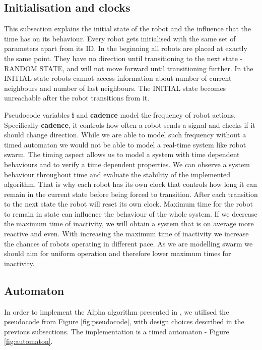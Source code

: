\subsection{Initialisation and clocks}
This subsection explains the initial state of the robot and the influence that the time has on its behaviour. Every robot gets initialised with the same set of parameters apart from its ID. In the beginning all robots are placed at exactly the same point. They have no direction until transitioning to the next state - RANDOM STATE, and will not move forward until transitioning further. In the INITIAL state robots cannot access information about number of current neighbours and number of last neighbours. The INITIAL state becomes unreachable after the robot transitions from it.

Pseudocode variables \textbf{i} and \textbf{cadence} model the frequency of robot actions. Specifically \textbf{cadence}, it controls how often a robot sends a signal and checks if it should change direction. While we are able to model such frequency without a timed automaton we would not be able to model a real-time system like robot swarm. The timing aspect allows us to model a system with time dependent behaviours and to verify a time dependent properties. We can observe a system behaviour throughout time and evaluate the stability of the implemented algorithm. That is why each robot has its own clock that controls how long it can remain in the current state before being forced to transition. After each transition to the next state the robot will reset its own clock. Maximum time for the robot to remain in state can influence the behaviour of the whole system. If we decrease the maximum time of inactivity, we will obtain a system that is on average more reactive and even. With increasing the maximum time of inactivity we increase the chances of robots operating in different pace. As we are modelling swarm we should aim for uniform operation and therefore lower maximum times for inactivity.

\subsection{Automaton}
In order to implement the Alpha algorithm presented in \cite{Minimalist_Coherent_Swarming_of_Wireless_Networked_Autonomous_Mobile_Robots}, we utilised the pseudocode from Figure \ref{fig:pseudocode}, with design choices described in the previous subsections. The implementation is a timed automaton - Figure \ref{fig:automaton}.

